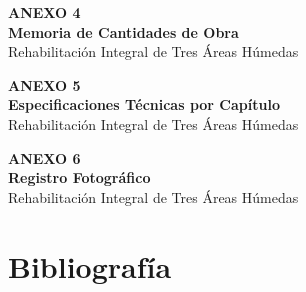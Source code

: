 ﻿\documentclass[12pt]{article}
\begin{document}
\vspace*{\fill}
\begin{center}
{\Huge\bfseries\color{primary}\lsstyle ANEXO 4}\\[1.2cm]
{\LARGE\bfseries\color{secondary} Memoria de Cantidades de Obra}\\[0.6cm]
{\large\color{primary!70!black} Rehabilitación Integral de Tres Áreas Húmedas}
\end{center}
\vspace*{\fill}
\newpage

%
\newpage
\thispagestyle{plain}
\vspace*{\fill}
\begin{center}
{\Huge\bfseries\color{primary}\lsstyle ANEXO 5}\\[1.2cm]
{\LARGE\bfseries\color{secondary} Especificaciones Técnicas por Capítulo}\\[0.6cm]
{\large\color{primary!70!black} Rehabilitación Integral de Tres Áreas Húmedas}
\end{center}
\vspace*{\fill}
\newpage


\newpage
\thispagestyle{plain}
\vspace*{\fill}
\begin{center}
{\Huge\bfseries\color{primary}\lsstyle ANEXO 6}\\[1.2cm]
{\LARGE\bfseries\color{secondary} Registro Fotográfico}\\[0.6cm]
{\large\color{primary!70!black} Rehabilitación Integral de Tres Áreas Húmedas}
\end{center}
\vspace*{\fill}
\newpage


\newpage
\part*{Bibliografía}
\end{document}
